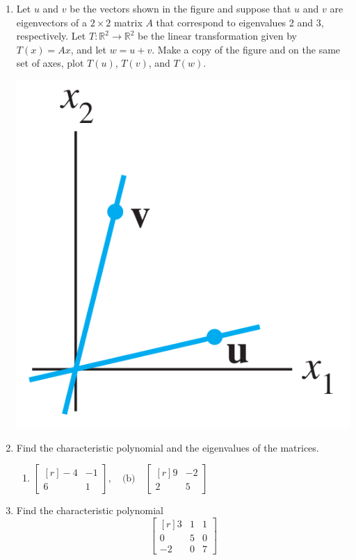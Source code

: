 \documentclass[12pt]{article}
\begin{document}
\begin{multicols*}{2}
\begin{enumerate}
		\item Let $u$ and $v$ be the vectors shown in the figure and suppose that $u$ and $v$ are eigenvectors of a $2\times 2$ matrix $A$ that correspond to eigenvalues 2 and 3, respectively. Let $T:\mathbb{R}^2\to \mathbb{R}^2$ be the linear transformation given by $T(x) = Ax$, and let $w=u+v$. Make a copy of the figure and on the same set of axes, plot $T(u)$, $T(v)$, and $T(w)$.\\
		\centerline{
		\includegraphics[scale=.3]{graph.PNG}}
		\vfill

		\item Find the characteristic polynomial and the eigenvalues of the matrices.
		\begin{enumerate}
			\item $\begin{bmatrix*}[r]
				-4&-1\\6&1
			\end{bmatrix*},\quad\text{(b)}\quad
			\begin{bmatrix*}[r]
				9 & -2\\
				2&5
			\end{bmatrix*}
			$
		\end{enumerate}
		\vfill

		\item Find the characteristic polynomial
		\[
		\begin{bmatrix*}[r]
			3&1&1\\
			0&5&0\\
			-2&0&7
		\end{bmatrix*}
		\]
		\vfill


\end{enumerate}
\end{multicols*}
\end{document}
